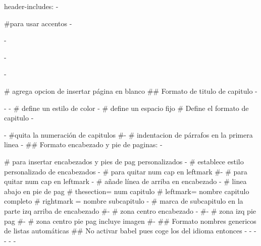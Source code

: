 header-includes:
- \usepackage[utf8]{inputenc} #para usar accentos
- \usepackage{graphicx}
- \usepackage[labelfont=bf]{caption}
- \usepackage{float}
- \usepackage{afterpage} # agrega opcion de insertar página en blanco
## Formato de titulo de capitulo
- \usepackage{titlesec, blindtext, color}
- \usetikzlibrary{calendar}
-   # define un estilo de color
- \newcommand{\hsp}{\hspace{20pt}}  # define un espacio fijo
# Define el formato de capitulo 
- \titleformat{\chapter}[hang]{\huge\bfseries}{\textcolor{gray75}{$\blacksquare$}\hsp}{0pt}{\huge\bfseries\MakeUppercase}
- \setcounter{secnumdepth}{0} #quita la numeración de capitulos
#- \setlength{\parindent}{1.5em} # indentacion de párrafos en la primera linea
- \addtolength{\headheight}{3pt}
## Formato encabezado y pie de paginas:
- \usepackage{fancyhdr} # para insertar encabezados y pies de pag personalizados
- \pagestyle{fancy} # establece estilo personalizado de encabezados
- \renewcommand{\chaptermark}[1]{\markboth{#1}{}} # para quitar num cap en leftmark
#- \renewcommand{\sectionmark}[1]{\markright{\arabic{section}.\#1}} # para quitar num cap en leftmark
- \renewcommand{\headrulewidth}{0.5pt} # añade línea de arriba en encabezado
- \renewcommand{\footrulewidth}{0.5pt} # linea abajo en pie de pag
#     thesection= num capitulo
#     leftmark= nombre capitulo completo
#     rightmark = nombre subcapitulo
- \lhead{\scriptsize \rightmark} # marca de subcapitulo en la parte izq arriba de encabezado
#- \chead{} # zona centro encabezado
- \rhead{\scriptsize \leftmark} 
#-  # zona izq pie pag
#-  # zona centro pie pag incluye imagen
#- \rfoot{\thepage}
## Formato nombres genericos de listas automáticas
## No activar babel pues coge los del idioma entonces
- \AtBeginDocument{\renewcommand{\contentsname}{Índice}}
- \AtBeginDocument{\renewcommand{\listfigurename}{Lista de figuras}}
- \AtBeginDocument{\renewcommand{\listtablename}{Lista de Tablas}}
- \AtBeginDocument{\renewcommand{\figurename}{Fig. }}
- \AtBeginDocument{\renewcommand{\tablename}{Tabla. }}
- \AtBeginDocument{\renewcommand{\chaptername }{Capítulo }}
\usepackage{booktabs}
\usepackage{amsmath,amssymb,amsfonts,latexsym,cancel}
\usepackage{rawfonts}
\usepackage{pictexwd}
\usepackage{tikz}
	\usetikzlibrary{shapes,arrows,spy,positioning,snakes}
